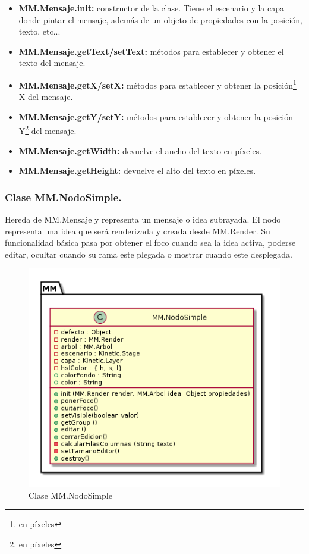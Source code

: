 \begin{itemize}
\item \textbf{MM.Mensaje.init:} constructor de la clase. Tiene el escenario y la capa donde pintar el mensaje, además de un objeto de propiedades con la posición, texto, etc...
\item \textbf{MM.Mensaje.getText/setText:} métodos para establecer y obtener el texto del mensaje. 
\item \textbf{MM.Mensaje.getX/setX:} métodos para establecer y obtener la posición\footnote{en píxeles} X del mensaje.
\item \textbf{MM.Mensaje.getY/setY:} métodos para establecer y obtener la posición Y\footnote{en píxeles} del mensaje.
\item \textbf{MM.Mensaje.getWidth:} devuelve el ancho del texto en píxeles.
\item \textbf{MM.Mensaje.getHeight:} devuelve el alto del texto en píxeles.
\end{itemize}

\subsubsection{Clase MM.NodoSimple.}
Hereda de MM.Mensaje y representa un mensaje o idea subrayada. El nodo representa una idea que será renderizada y creada desde MM.Render. Su funcionalidad básica pasa por obtener el foco cuando sea la idea activa, poderse editar, ocultar cuando su rama este plegada o mostrar cuando este desplegada.

\begin{figure}[tbph]
\centering
\includegraphics[width=0.6\linewidth]{imagenes/diagrama-clase-mm-nodosimple}
\caption{Clase MM.NodoSimple}
\label{fig:diagrama-clase-mm-nodosimple}
\end{figure}

